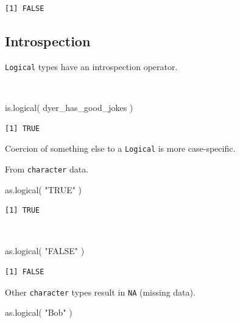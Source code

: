 \documentclass[
  letterpaper,
]{book}
\newenvironment{Shaded}{\begin{snugshade}}{\end{snugshade}}
\newcommand{\FunctionTok}[1]{\textcolor[rgb]{0.28,0.35,0.67}{#1}}
\newcommand{\NormalTok}[1]{\textcolor[rgb]{0.00,0.23,0.31}{#1}}
\newcommand{\StringTok}[1]{\textcolor[rgb]{0.13,0.47,0.30}{#1}}
\begin{document}
\begin{verbatim}
[1] FALSE
\end{verbatim}

\subsection{Introspection}\label{introspection}

\texttt{Logical} types have an introspection operator.

~

\begin{Shaded}
\begin{Highlighting}[]
\FunctionTok{is.logical}\NormalTok{( dyer\_has\_good\_jokes )}
\end{Highlighting}
\end{Shaded}

\begin{verbatim}
[1] TRUE
\end{verbatim}

Coercion of something else to a \texttt{Logical} is more case-specific.

From \texttt{character} data.

\begin{Shaded}
\begin{Highlighting}[]
\FunctionTok{as.logical}\NormalTok{( }\StringTok{"TRUE"}\NormalTok{ )}
\end{Highlighting}
\end{Shaded}

\begin{verbatim}
[1] TRUE
\end{verbatim}

~

\begin{Shaded}
\begin{Highlighting}[]
\FunctionTok{as.logical}\NormalTok{( }\StringTok{"FALSE"}\NormalTok{ )}
\end{Highlighting}
\end{Shaded}

\begin{verbatim}
[1] FALSE
\end{verbatim}

Other \texttt{character} types result in \texttt{NA} (missing data).

\begin{Shaded}
\begin{Highlighting}[]
\FunctionTok{as.logical}\NormalTok{( }\StringTok{"Bob"}\NormalTok{ )}
\end{Highlighting}
\end{Shaded}
\end{document}
